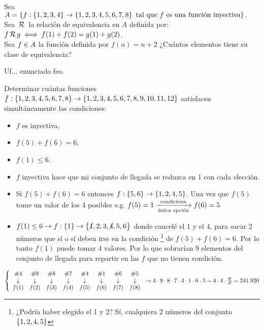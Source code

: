 \ejercicio
Sea $A = \set{f : \set{1,2,3,4} \to \set{1,2,3,4,5,6,7,8} \text{ tal que $f$ es una función inyectiva}}.$\\
Sea $\relacion$ la relación de equivalencia en $A$ definida por: $f \relacion g \sisolosi f(1) + f(2) = g(1) + g(2)$.\\
Sea $f \en A$ la función definida por $f(n) = n+2$ ¿Cuántos elementos tiene su clase de equivalencia?

\separadorCorto

Uf... enunciado feo.\\


\ejercicio

Determinar cuántas funciones $f : \set{1,2,3,4,5,6,7,8} \to \set{\foreach \i in {1,...,11}{ \i, }12}$ satisfacen
simultáneamente las condiciones:\\
\begin{multicols}{3}
	\begin{itemize}
		\item $f$ es inyectiva,
		\item $f(5) + f(6) = 6$,
		\item $f(1) \leq 6$.
	\end{itemize}
\end{multicols}

\separadorCorto

\begin{itemize}
	\item $f$ inyectiva hace que mi conjunto de llegada se reduzca en 1 con cada elección.

	\item Si $f(5) + f(6) = 6$ entonces $f: \set{5,6} \to \set{1,2,4,5}$. Una vez que $f(5)$ tome
	      un valor de los 4 posibles e.g. $f(5) = 1 \flecha{condiciona}[única opción] f(6) = 5 $

	\item $f(1) \leq 6 \to f : \set{1} \to \set{\cancel{1},2,3,\cancel{4},5,6}$ donde cancelé el 1
	      y el 4, para sacar 2 números que sí o sí deben irse en la condición
	      \footnote{¿Podría haber elegido el 1 y 2? Sí, cualquiera 2 números del conjunto $\set{1,2,4,5}$}
	      de $f(5) + f(6) = 6$. Por lo
	      tanto $f(1)$ puede tomar 4 valores. Por lo que sobrarían 9 elementos del conjunto de llegada para repartir
	      en las $f$ que no tienen condición.
\end{itemize}

$\llave{c c c c c c c c}
	{
		\#4 & \#9 & \#8 & \#7 & \#4 & \#1 & \#6 & \#5 \\
		\downarrow & \downarrow & \downarrow &\downarrow & \downarrow & \downarrow &\downarrow &\downarrow\\
		f(1) & f(2) &f(3) &f(4) &f(5) &f(6) & f(7) & f(8)
	}
	\to 4 \cdot 9 \cdot 8 \cdot 7 \cdot 4 \cdot 1 \cdot 6 \cdot 5 = 4 \cdot 4 \cdot \frac{9!}{4!} = 241.920$\\

